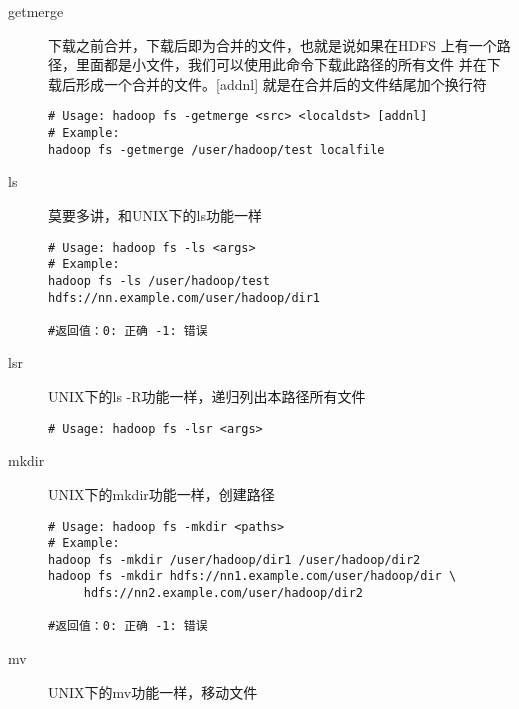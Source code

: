 \documentclass{article}
\begin{document}
\begin{description}
\item[getmerge] 下载之前合并，下载后即为合并的文件，也就是说如果在HDFS
上有一个路径，里面都是小文件，我们可以使用此命令下载此路径的所有文件
并在下载后形成一个合并的文件。[addnl] 就是在合并后的文件结尾加个换行符

\begin{verbatim}
# Usage: hadoop fs -getmerge <src> <localdst> [addnl]
# Example: 
hadoop fs -getmerge /user/hadoop/test localfile
\end{verbatim}

\item[ls] 莫要多讲，和UNIX下的ls功能一样

\begin{verbatim}
# Usage: hadoop fs -ls <args>
# Example: 
hadoop fs -ls /user/hadoop/test hdfs://nn.example.com/user/hadoop/dir1

#返回值：0: 正确 -1: 错误
\end{verbatim}


\item[lsr] UNIX下的ls -R功能一样，递归列出本路径所有文件

\begin{verbatim}
# Usage: hadoop fs -lsr <args>
\end{verbatim}

\item[mkdir] UNIX下的mkdir功能一样，创建路径

\begin{verbatim}
# Usage: hadoop fs -mkdir <paths>
# Example:
hadoop fs -mkdir /user/hadoop/dir1 /user/hadoop/dir2
hadoop fs -mkdir hdfs://nn1.example.com/user/hadoop/dir \
	 hdfs://nn2.example.com/user/hadoop/dir2

#返回值：0: 正确 -1: 错误
\end{verbatim}

\item[mv] UNIX下的mv功能一样，移动文件


\end{description}
\end{document}
